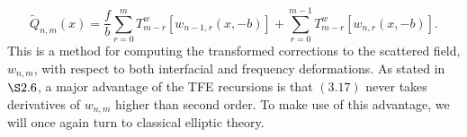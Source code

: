 \begin{equation}\tilde{Q}_{n,m}(x)=\frac{f}{b} \sum_{r=0}^m T^w_{m-r}[w_{n-1,r}(x,-b)] + \sum_{r=0}^{m-1}T_{m-r}^w[w_{n,r}(x,-b)]. \end{equation}
This is a method for computing the transformed corrections to the scattered field, $w_{n,m}$, with respect to both interfacial and frequency deformations. As stated in $\S 2.6$, a major advantage of the TFE recursions is that $(3.17)$ never takes derivatives of $w_{n,m}$ higher than second order. To make use of this advantage, we will once again turn to classical elliptic theory.